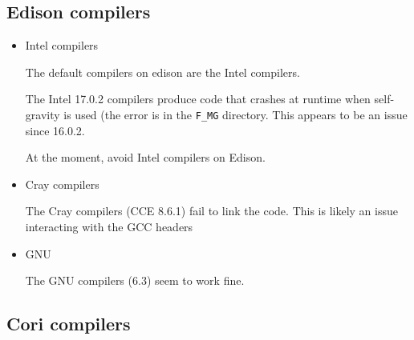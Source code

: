


\subsection{Edison compilers}

\begin{itemize}
\item Intel compilers

  The default compilers on edison are the Intel compilers.  

  The Intel 17.0.2 compilers produce code that crashes at runtime when self-gravity
  is used (the error is in the {\tt F\_MG} directory.  This appears to be an issue since
  16.0.2.

  At the moment, avoid Intel compilers on Edison.


\item Cray compilers

  The Cray compilers (CCE 8.6.1) fail to link the code.  This is likely an issue interacting
  with the GCC headers

\item GNU

  The GNU compilers (6.3) seem to work fine.

\end{itemize}


\subsection{Cori compilers}

